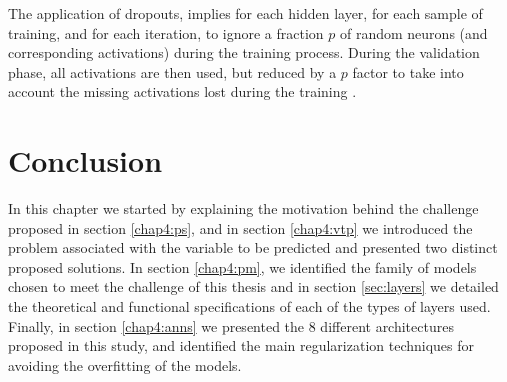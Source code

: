The application of dropouts, implies for each hidden layer, for each sample of training, and for each iteration, to ignore a fraction $p$ of random neurons (and corresponding activations) during the training process. During the validation phase, all activations are then used, but reduced by a $p$ factor to take into account the missing activations lost during the training \cite{drop0}.

\section{Conclusion}

In this chapter we started by explaining the motivation behind the challenge proposed in section \ref{chap4:ps}, and in section \ref{chap4:vtp} we introduced the problem associated with the variable to be predicted and presented two distinct proposed solutions. In section \ref{chap4:pm}, we identified the family of models chosen to meet the challenge of this thesis and in section \ref{sec:layers} we detailed the theoretical and functional specifications of each of the types of layers used. Finally, in section \ref{chap4:anns} we presented the 8 different architectures proposed in this study, and identified the main regularization techniques for avoiding the overfitting of the models. 
